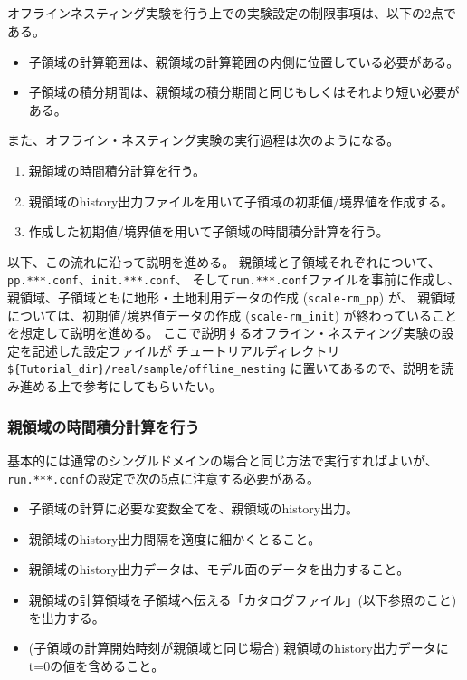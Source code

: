 \subsection{\SubsecOflineNesting} \label{subsec:nest_offline}

オフラインネスティング実験を行う上での実験設定の制限事項は、以下の2点である。
\begin{itemize}
 \item 子領域の計算範囲は、親領域の計算範囲の内側に位置している必要がある。
 \item 子領域の積分期間は、親領域の積分期間と同じもしくはそれより短い必要がある。
\end{itemize}

また、オフライン・ネスティング実験の実行過程は次のようになる。
{\gt
\begin{enumerate}
 \item 親領域の時間積分計算を行う。
 \item 親領域のhistory出力ファイルを用いて子領域の初期値/境界値を作成する。
 \item 作成した初期値/境界値を用いて子領域の時間積分計算を行う。
\end{enumerate}
}

以下、この流れに沿って説明を進める。
親領域と子領域それぞれについて、\verb|pp.***.conf|、\verb|init.***.conf|、
そして\verb|run.***.conf|ファイルを事前に作成し、
親領域、子領域ともに地形・土地利用データの作成 (\verb|scale-rm_pp|) が、
親領域については、初期値/境界値データの作成 (\verb|scale-rm_init|) が終わっていることを想定して説明を進める。
ここで説明するオフライン・ネスティング実験の設定を記述した設定ファイルが
チュートリアルディレクトリ\verb|${Tutorial_dir}/real/sample/offline_nesting|
に置いてあるので、説明を読み進める上で参考にしてもらいたい。

\subsubsection{親領域の時間積分計算を行う}
基本的には通常のシングルドメインの場合と同じ方法で実行すればよいが、
\verb|run.***.conf|の設定で次の5点に注意する必要がある。

\begin{itemize}
 \item 子領域の計算に必要な変数全てを、親領域のhistory出力。
 \item 親領域のhistory出力間隔を適度に細かくとること。
 \item 親領域のhistory出力データは、モデル面のデータを出力すること。
 \item 親領域の計算領域を子領域へ伝える「カタログファイル」(以下参照のこと)を出力する。
 \item (子領域の計算開始時刻が親領域と同じ場合) 親領域のhistory出力データにt=0の値を含めること。
\end{itemize}


